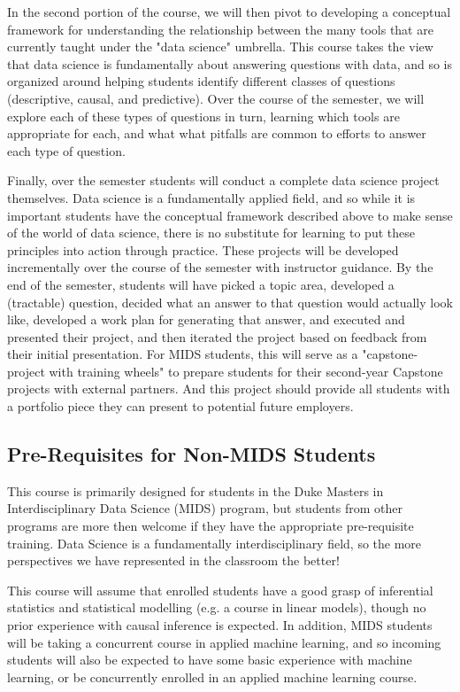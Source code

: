 \documentclass[12pt]{article}
\begin{document}
In the second portion of the course, we will then pivot to developing a conceptual framework for understanding the relationship between the many tools that are currently taught under the "data science" umbrella. This course takes the view that data science is fundamentally about answering questions with data, and so is organized around helping students identify different classes of questions (descriptive, causal, and predictive). Over the course of the semester, we will explore each of these types of questions in turn, learning which tools are appropriate for each, and what what pitfalls are common to efforts to answer each type of question.

Finally, over the semester students will conduct a complete data science project themselves. Data science is a fundamentally applied field, and so while it is important students have the conceptual framework described above to make sense of the world of data science, there is no substitute for learning to put these principles into action through practice. These projects will be developed incrementally over the course of the semester with instructor guidance. By the end of the semester, students will have picked a topic area, developed a (tractable) question, decided what an answer to that question would actually look like, developed a work plan for generating that answer, and executed and presented their project, and then iterated the project based on feedback from their initial presentation. For MIDS students, this will serve as a "capstone-project with training wheels" to prepare students for their second-year Capstone projects with external partners. And this project should provide all students with a portfolio piece they can present to potential future employers. 

\subsection{Pre-Requisites for Non-MIDS Students}

This course is primarily designed for students in the Duke Masters in Interdisciplinary Data Science (MIDS) program, but students from other programs are more then welcome if they have the appropriate pre-requisite training. Data Science is a fundamentally interdisciplinary field, so the more perspectives we have represented in the classroom the better!

This course will assume that enrolled students have a good grasp of inferential statistics and statistical modelling (e.g. a course in linear models), though no prior experience with causal inference is expected. In addition, MIDS students will be taking a concurrent course in applied machine learning, and so incoming students will also be expected to have some basic experience with machine learning, or be concurrently enrolled in an applied machine learning course.
\end{document}
